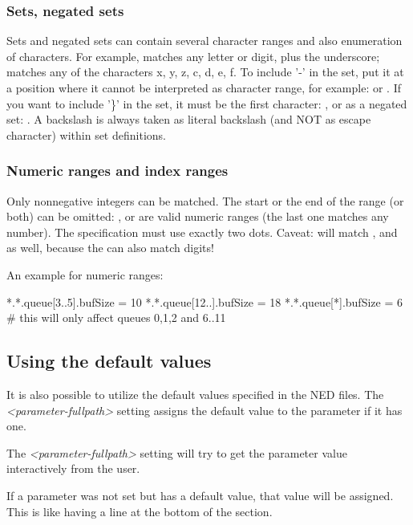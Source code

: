 \subsubsection{Sets, negated sets}

Sets and negated sets can contain several character ranges and also
enumeration of characters. For example,  matches any letter
or digit, plus the underscore;  matches any of the characters
x, y, z, c, d, e, f.
To include '-' in the set, put it at a position where it cannot be
interpreted as character range, for example:  or .
If you want to include '\}' in the set, it must be the first
character: , or as a negated set: . A backslash
is always taken as literal backslash (and NOT as escape character)
within set definitions.


\subsubsection{Numeric ranges and index ranges}

Only nonnegative integers can be matched.  The start or the end of the range
(or both) can be omitted: ,  or 
are valid numeric ranges (the last one matches any number).
The specification must use exactly two dots.
Caveat:  will match ,  and  as well,
because the \ttt{*} can also match digits!

An example for numeric ranges:

\begin{inifile}
[General]
*.*.queue[3..5].bufSize = 10
*.*.queue[12..].bufSize = 18
*.*.queue[*].bufSize = 6  # this will only affect queues 0,1,2 and 6..11
\end{inifile}


\subsection{Using the default values}

It is also possible to utilize the default values specified in the NED files.
The \textit{<parameter-fullpath>} setting assigns
the default value to the parameter if it has one.


The \textit{<parameter-fullpath>} setting will try to get the parameter
value interactively from the user.


If a parameter was not set but has a default value, that value will be
assigned. This is like having a  line at the
bottom of the \ttt{[General]} section.


